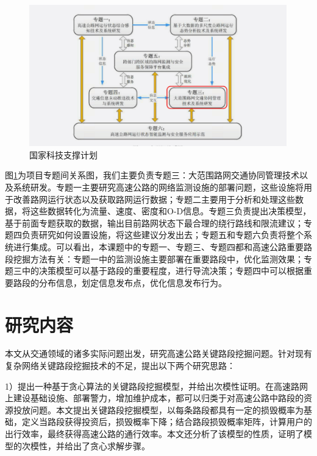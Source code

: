 				\begin{figure}[h]
				\centering
						\begin{minipage}{0.8\linewidth}
							\centering
							\includegraphics[width=4.4in]{picture/zhichengjihua}
							\caption{国家科技支撑计划}
							\label{zhichengjihua}
						\end{minipage}%
				\end{figure}
图\ref{zhichengjihua}为项目专题间关系图，我们主要负责专题三：大范围路网交通协同管理技术以及系统研发。专题一主要研究高速公路的网络监测设施的部署问题，这些设施将用于改善路网运行状态以及获取路网运行数据；专题二主要用于分析和处理这些数据，将这些数据转化为流量、速度、密度和O-D信息。专题三负责提出决策模型，基于前面专题获取的数据，输出目前路网状态下最合理的绕行路线和限流建议；专题四负责研究如何设置设施，将这些建议分发出去；专题五和专题六负责将整个系统进行集成。可以看出，本课题中的专题一、专题三、专题四都和高速公路重要路段挖掘方法有关：专题一中的监测设施主要部署在重要路段中，优化监测效果；专题三中的决策模型可以基于路段的重要程度，进行导流决策；专题四中可以根据重要路段的分布信息，划定信息发布点，优化信息发布行为。





\section{研究内容}
    	本文从交通领域的诸多实际问题出发，研究高速公路关键路段挖掘问题。针对现有复杂网络关键路段挖掘技术的不足，提出以下两个研究思路：
    
		1）提出一种基于贪心算法的关键路段挖掘模型，并给出次模性证明。在高速路网上建设基础设施、部署警力，增加维护成本，都可以归类于对高速公路中路段的资源投放问题。本文提出关键路段挖掘模型，以每条路段都具有一定的损毁概率为基础，定义当路段获得投资后，损毁概率下降；结合路段损毁概率矩阵，计算用户的出行效率，最终获得高速公路的通行效率。本文还分析了该模型的性质，证明了模型的次模性，并给出了贪心求解步骤。

